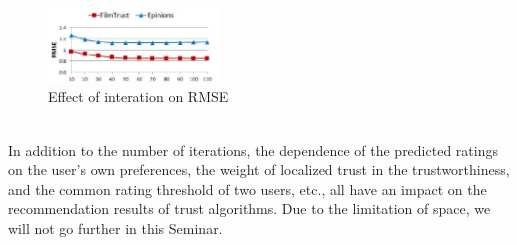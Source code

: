     \begin{figure}[H] %
        \centering %
        \includegraphics[width=0.4\textwidth]{figures/parameter2.png} %
        \caption{Effect of interation on RMSE} %
        \label{Fig.2: Effect of interation on RMSE} %
        \end{figure}
\\
In addition to the number of iterations, the dependence of the predicted ratings on 
the user's own preferences, the weight of localized trust in the trustworthiness, and 
the common rating threshold of two users, etc., all have an impact on the recommendation 
results of trust algorithms\cite{b26}. Due to the limitation of space, we will not go further 
in this Seminar.
